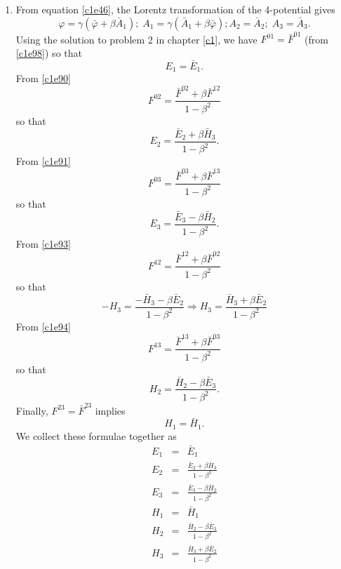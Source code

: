 \begin{enumerate}
\item From equation \eqref{c1e46}, the Lorentz transformation of the 4-potential
gives
\begin{equation}\label{c3e80}
\varphi = \gamma(\bar{\varphi} + \beta\bar{A}_1);
\; A_1 = \gamma(\bar{A}_1 + \beta\bar{\varphi}); A_2 = \bar{A}_2;\; 
A_3 = \bar{A}_3.
\end{equation}
Using the solution to problem 2 in chapter \ref{c1}, we have $F^{01} = 
\bar{F}^{01}$ (from \eqref{c1e98}) so that 
\begin{equation*}
E_1 = \bar{E}_1.
\end{equation*}
From \eqref{c1e90}
\[
F^{02} = \frac{\bar{F}^{02} + \beta\bar{F}^{12}}{1 - \beta^2}
\]
so that
\begin{equation*}
E_2 = \frac{\bar{E}_2 + \beta\bar{H}_3}{1 - \beta^2}.
\end{equation*}
From \eqref{c1e91}
\[
F^{03} = \frac{\bar{F}^{03} + \beta\bar{F}^{13}}{1 - \beta^2}
\]
so that
\begin{equation*}
E_3 = \frac{\bar{E}_3 - \beta\bar{H}_2}{1 - \beta^2}.
\end{equation*}
From \eqref{c1e93}
\[
F^{12} = \frac{\bar{F}^{12} + \beta\bar{F}^{02}}{1 - \beta^2}
\]
so that
\begin{equation*}
-H_3 = \frac{-\bar{H}_3 - \beta\bar{E}_2}{1 - \beta^2} \Rightarrow 
H_3 = \frac{\bar{H}_3 + \beta\bar{E}_2}{1 - \beta^2}
\end{equation*}
From \eqref{c1e94}
\[
F^{13} = \frac{\bar{F}^{13} + \beta\bar{F}^{03}}{1 - \beta^2}
\]
so that
\begin{equation*}
H_2 = \frac{\bar{H}_2 - \beta\bar{E}_3}{1 - \beta^2}.
\end{equation*}
Finally, $F^{23} = \bar{F}^{23}$ implies
\begin{equation*}
H_1 = \bar{H}_1.
\end{equation*}
We collect these formulae together as
\begin{eqnarray}
E_1 &=& \bar{E}_1 \\ \label{c3e81}
E_2 &=& \frac{\bar{E}_2 + \beta\bar{H}_3}{1 - \beta^2} \\ \label{c3e82}
E_3 &=& \frac{\bar{E}_3 - \beta\bar{H}_2}{1 - \beta^2} \\ \label{c3e83}
H_1 &=& \bar{H}_1 \\ \label{c3e84}
H_2 &=& \frac{\bar{H}_2 - \beta\bar{E}_3}{1 - \beta^2} \\ \label{c3e85}
H_3 &=& \frac{\bar{H}_3 + \beta\bar{E}_2}{1 - \beta^2} \label{c3e86}
\end{eqnarray}


\end{enumerate}
